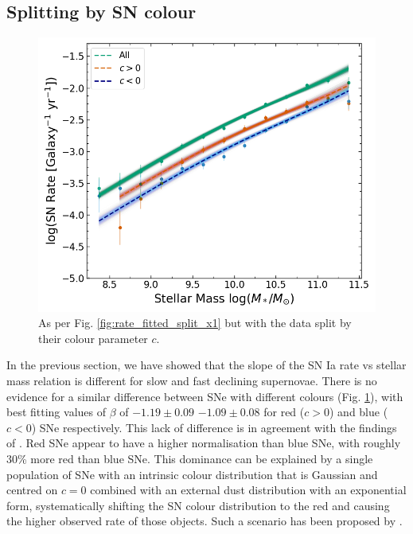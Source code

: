 \documentclass[fleqn,usenatbib]{mnras}
\begin{document}
\subsection{Splitting by SN colour \label{subsec:split_c}}
\begin{figure}
    \centering
    \includegraphics[width=.5\textwidth]{figs/rate_vs_mass_DTD_fit_beta_norm_Qerf1.1_split_c.png}
    \caption{As per Fig. \ref{fig:rate_fitted_split_x1} but with the data split by their colour parameter $c$.%
    \label{fig:rate_fitted_split_c}}
\end{figure}

In the previous section, we have showed that the slope of the SN Ia rate vs stellar mass relation is different for slow and fast declining supernovae. There is no evidence for a similar difference between SNe with different colours (Fig. \ref{fig:rate_fitted_split_c}), with best fitting values of $\beta$ of $-1.19\pm0.09$ $-1.09\pm0.08$ for red ($c > 0$) and blue ($c<0$) SNe respectively. This lack of difference is in agreement with the findings of \citet{Sullivan2010}. Red SNe appear to have a higher normalisation than blue SNe, with roughly 30\% more red than blue SNe. This dominance can be explained by a single population of SNe with an intrinsic colour distribution that is Gaussian and centred on $c=0$ combined with an external dust distribution with an exponential form, systematically shifting the SN colour distribution to the red and causing the higher observed rate of those objects. Such a scenario has been proposed by \citet{Brout2020}. 
\end{document}
